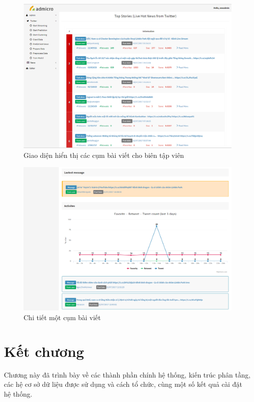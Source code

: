 \begin{figure}[H]
		\centering
	\includegraphics[width=0.96\linewidth]{Chapter3/Chapter3Figs/TopStories2}
	\caption{Giao diện hiển thị các cụm bài viết cho biên tập viên}
	\label{fig:topstories}
\end{figure}

\begin{figure}[H]
	\centering
	\includegraphics[width=0.96\linewidth]{Chapter3/Chapter3Figs/StoryDetails2}
	\caption{Chi tiết một cụm bài viết}
	\label{fig:storydetail}
\end{figure}

\section{Kết chương}
Chương này đã trình bày về các thành phần chính hệ thống, kiến trúc phân tầng, các hệ cơ sở dữ liệu được sử dụng và cách tổ chức, cùng một số kết quả cài đặt hệ thống.